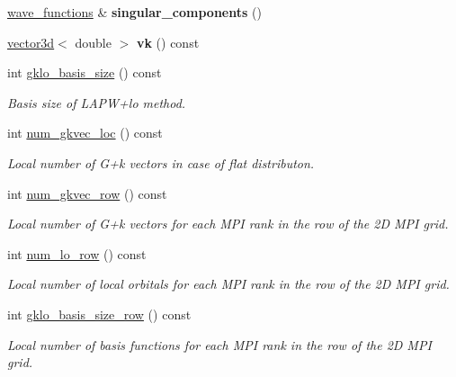 \begin{DoxyCompactItemize}
\item 
\hypertarget{classsirius_1_1_k__point_a52580025aaa58b59984e5a665e76285b}{}\hyperlink{classsddk_1_1wave__functions}{wave\+\_\+functions} \& {\bfseries singular\+\_\+components} ()\label{classsirius_1_1_k__point_a52580025aaa58b59984e5a665e76285b}

\item 
\hypertarget{classsirius_1_1_k__point_a06ebbbcfeeca2f7914506725ca78cef0}{}\hyperlink{classgeometry3d_1_1vector3d}{vector3d}$<$ double $>$ {\bfseries vk} () const \label{classsirius_1_1_k__point_a06ebbbcfeeca2f7914506725ca78cef0}

\item 
int \hyperlink{classsirius_1_1_k__point_ad82e2eea8928aae92e96dc68cb4dccbb}{gklo\+\_\+basis\+\_\+size} () const 
\begin{DoxyCompactList}\small\item\em Basis size of L\+A\+P\+W+lo method. \end{DoxyCompactList}\item 
int \hyperlink{classsirius_1_1_k__point_a64d42eb643d2381fd385de74404c4a24}{num\+\_\+gkvec\+\_\+loc} () const 
\begin{DoxyCompactList}\small\item\em Local number of G+k vectors in case of flat distributon. \end{DoxyCompactList}\item 
int \hyperlink{classsirius_1_1_k__point_a3115b04da9afda02b55a6c201cd426a2}{num\+\_\+gkvec\+\_\+row} () const 
\begin{DoxyCompactList}\small\item\em Local number of G+k vectors for each M\+P\+I rank in the row of the 2\+D M\+P\+I grid. \end{DoxyCompactList}\item 
int \hyperlink{classsirius_1_1_k__point_adbc51ce58775b0891c3ab278daa8e619}{num\+\_\+lo\+\_\+row} () const 
\begin{DoxyCompactList}\small\item\em Local number of local orbitals for each M\+P\+I rank in the row of the 2\+D M\+P\+I grid. \end{DoxyCompactList}\item 
int \hyperlink{classsirius_1_1_k__point_abee4610e47f9d93833d3b6be9979b471}{gklo\+\_\+basis\+\_\+size\+\_\+row} () const 
\begin{DoxyCompactList}\small\item\em Local number of basis functions for each M\+P\+I rank in the row of the 2\+D M\+P\+I grid. \end{DoxyCompactList}\item 

\end{DoxyCompactItemize}
